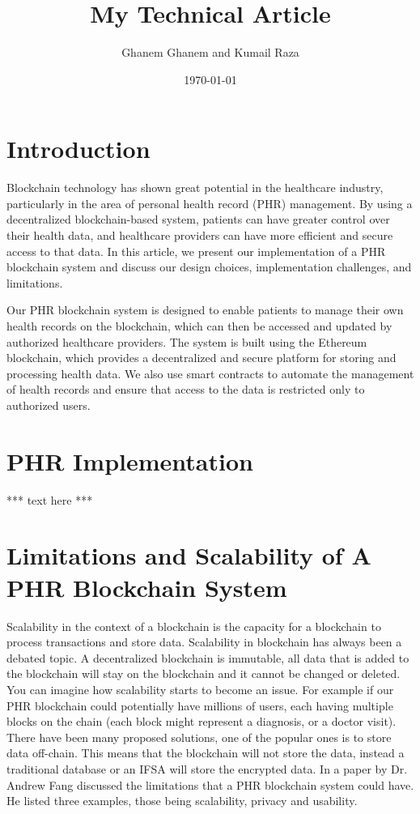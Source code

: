 \documentclass{article}
\title{My Technical Article}
\author{Ghanem Ghanem and Kumail Raza}
\date{\today}
\begin{document}
\maketitle

\section{Introduction}

Blockchain technology has shown great potential in the healthcare industry, 
particularly in the area of personal health record (PHR) management. 
By using a decentralized blockchain-based system, patients can have greater 
control over their health data, and healthcare providers can have more efficient 
and secure access to that data. In this article, we present our implementation of 
a PHR blockchain system and discuss our design choices, implementation challenges,
and limitations.

Our PHR blockchain system is designed to enable patients to manage their own health records on the blockchain, 
which can then be accessed and updated by authorized healthcare providers. The system is built using the Ethereum blockchain, 
which provides a decentralized and secure platform for storing and processing health data. 
We also use smart contracts to automate the management of health records and ensure that access to the data is restricted only to authorized users.

\section{PHR Implementation}
*** text here ***

\section{Limitations and Scalability of A PHR Blockchain System}

Scalability in the context of a blockchain is the capacity for a blockchain
to process transactions and store data. Scalability in blockchain has always
been a debated topic. A decentralized blockchain is immutable, all data that 
is added to the blockchain will stay on the blockchain and it cannot be changed
or deleted. You can imagine how scalability starts to become an issue. 
For example if our PHR blockchain could potentially have millions of users, 
each having multiple blocks on the chain (each block might represent a 
diagnosis, or a doctor visit). There have been many proposed solutions, 
one of the popular ones is to store data off-chain. This means that the 
blockchain will not store the data, instead a traditional database or an 
IFSA will store the encrypted data. In a paper by Dr. Andrew Fang discussed 
the limitations that a PHR blockchain system could have. He listed three 
examples, those being scalability, privacy and usability.
\end{document}

